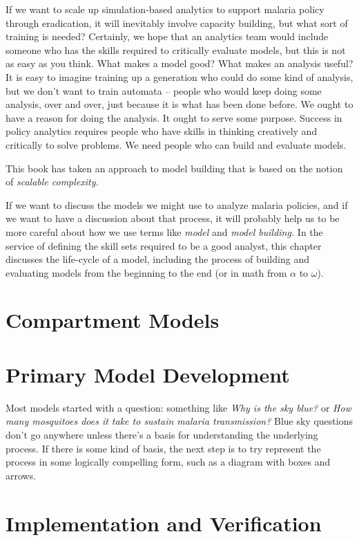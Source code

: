 \documentclass[
]{book}
\begin{document}
If we want to scale up simulation-based analytics to support malaria policy through eradication, it will inevitably involve capacity building, but what sort of training is needed? Certainly, we hope that an analytics team would include someone who has the skills required to critically evaluate models, but this is not as easy as you think. What makes a model good? What makes an analysis useful? It is easy to imagine training up a generation who could do some kind of analysis, but we don't want to train automata -- people who would keep doing some analysis, over and over, just because it is what has been done before. We ought to have a reason for doing the analysis. It ought to serve some purpose. Success in policy analytics requires people who have skills in thinking creatively and critically to solve problems. We need people who can build and evaluate models.

This book has taken an approach to model building that is based on the notion of \emph{scalable complexity.}

If we want to discuss the models we might use to analyze malaria policies, and if we want to have a discussion about that process, it will probably help us to be more careful about how we use terms like \emph{model} and \emph{model building.} In the service of defining the skill sets required to be a good analyst, this chapter discusses the life-cycle of a model, including the process of building and evaluating models from the beginning to the end (or in math from \(\alpha\) to \(\omega\)).

\section{Compartment Models}\label{compartment-models}

\section{Primary Model Development}\label{primary-model-development}

Most models started with a question: something like \emph{Why is the sky blue?} or \emph{How many mosquitoes does it take to sustain malaria transmission?} Blue sky questions don't go anywhere unless there's a basis for understanding the underlying process. If there is some kind of basis, the next step is to try represent the process in some logically compelling form, such as a diagram with boxes and arrows.

\section{Implementation and Verification}\label{implementation-and-verification}
\end{document}
